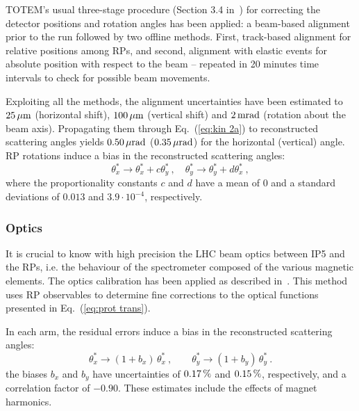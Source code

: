 TOTEM's usual three-stage procedure (Section 3.4 in~\cite{totem-ijmp}) for correcting the detector positions and rotation angles has been applied: a beam-based alignment prior to the run followed by two offline methods. First, track-based alignment for relative positions among RPs, and second, alignment with elastic events for absolute position with respect to the beam -- repeated in 20 minutes time intervals to check for possible beam movements.

Exploiting all the methods, the alignment uncertainties have been estimated to $25\,{\rm \mu m}$ (horizontal shift), $100\,{\rm \mu m}$ (vertical shift) and $2\,{\rm m rad}$ (rotation about the beam axis). Propagating them through Eq.~(\ref{eq:kin 2a}) to reconstructed scattering angles yields $0.50\,{\rm \mu rad}$ ($0.35\,{\rm \mu rad}$) for the horizontal (vertical) angle. RP rotations induce a bias in the reconstructed scattering angles:
\begin{equation}
\label{eq:alig rot bias}
	\theta_x^* \rightarrow \theta_x^* + c \theta_y^*\ ,\quad
	\theta_y^* \rightarrow \theta_y^* + d \theta_x^*\ ,
\end{equation}
where the proportionality constants $c$ and $d$ have a mean of 0 and a standard deviations of $0.013$ and $3.9\cdot10^{-4}$, respectively.





\subsubsection{Optics}
\label{sec:optics}

It is crucial to know with high precision the LHC beam optics between IP5 and the RPs, i.e. the behaviour of the spectrometer composed of the various magnetic elements. The optics calibration has been applied as described in~\cite{totem-optics}. This method uses RP observables to determine fine corrections to the optical functions presented in Eq.~(\ref{eq:prot trans}).

In each arm, the residual errors induce a bias in the reconstructed scattering angles:
\begin{equation}
\label{eq:opt bias}
	\theta_x^* \rightarrow (1 + b_x)\, \theta_x^*\ ,\qquad
	\theta_y^* \rightarrow (1 + b_y)\, \theta_y^*\ .
\end{equation}
the biases $b_x$ and $b_y$ have uncertainties of $0.17\,{\rm \%}$ and $0.15\,{\rm \%}$, respectively, and a correlation factor of $-0.90$.  These estimates include the effects of magnet harmonics.

